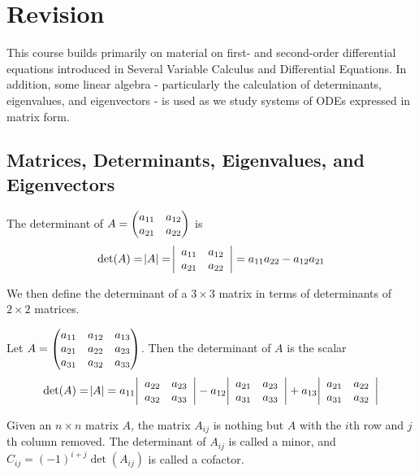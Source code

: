 \setcounter{section}{-1}
\section{Revision}

This course builds primarily on material on first- and second-order differential equations introduced in Several Variable Calculus and Differential Equations. In addition, some linear algebra - particularly the calculation of determinants, eigenvalues, and eigenvectors - is used as we study systems of ODEs expressed in matrix form.

\subsection{Matrices, Determinants, Eigenvalues, and Eigenvectors}

\begin{definition}
	The determinant of $A = \begin{pmatrix}a_{11} & a_{12} \\ a_{21} & a_{22}\end{pmatrix}$ is
	\[
	\det(A) = \abs{A} = \abs{\begin{array}{rr}a_{11} & a_{12} \\ a_{21} & a_{22}\end{array}} = a_{11}a_{22} - a_{12}a_{21}
	\]
\end{definition}

We then define the determinant of a $3 \times 3$ matrix in terms of determinants of $2 \times 2$ matrices.

\begin{definition}Let $A = \begin{pmatrix}a_{11} & a_{12} & a_{13} \\ a_{21} & a_{22} & a_{23} \\ a_{31} & a_{32} & a_{33}\end{pmatrix}$. Then the determinant of $A$ is the scalar
	\[
	\det(A) = \abs{A} = a_{11}\abs{\begin{array}{rr}a_{22} & a_{23} \\ a_{32} & a_{33}\end{array}} - a_{12}\abs{\begin{array}{rr}a_{21} & a_{23} \\ a_{31} & a_{33}\end{array}} + a_{13}\abs{\begin{array}{rr}a_{21} & a_{22} \\ a_{31} & a_{32}\end{array}}
	\]
\end{definition}

Given an $n \times n $ matrix $A$, the matrix $A_{ij}$ is nothing but $A$ with the $i$th row and $j$th column removed. The determinant of $A_{ij}$ is called a minor, and $C_{ij} = (-1)^{i+j} \det(A_{ij})$ is called a cofactor.

